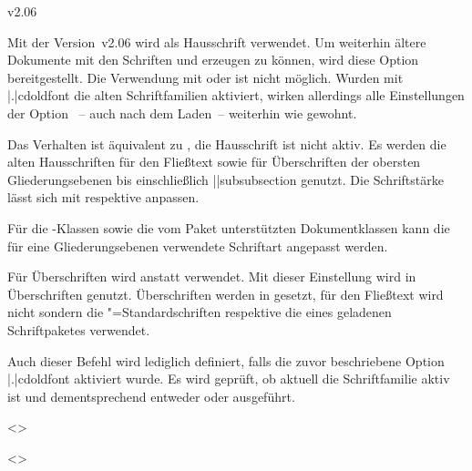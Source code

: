 \begin{NoIndexDefault}
\begin{Cessations}{v2.06}
\begin{Declaration}
Mit der Version~v2.06 wird \OpenSans als Hausschrift verwendet. Um weiterhin 
ältere Dokumente mit den Schriften \Univers und \DIN erzeugen zu können, wird 
diese Option bereitgestellt.
Die Verwendung mit  oder  ist nicht möglich. 
Wurden mit \Option|.|{cdoldfont} die alten Schriftfamilien aktiviert, wirken 
allerdings alle Einstellungen der Option ~-- auch nach dem 
Laden~-- weiterhin wie gewohnt.
\begin{DeclareValues}
  Das Verhalten ist äquivalent zu , die Hausschrift ist 
  nicht aktiv.
  Es werden die alten Hausschriften \Univers für den Fließtext sowie \DIN für 
  Überschriften der obersten Gliederungsebenen bis einschließlich 
  \Macro||{subsubsection} genutzt. Die Schriftstärke lässt sich mit 
   respektive  anpassen.
\end{DeclareValues}

Für die \TUDScript-Klassen sowie die vom Paket  
unterstützten Dokumentklassen kann die für eine Gliederungsebenen verwendete 
Schriftart angepasst werden.
\begin{DeclareValues}
  Für Überschriften wird \Univers anstatt \DIN verwendet.
  Mit dieser Einstellung wird \DIN in Überschriften genutzt. 
  Überschriften werden in \DIN gesetzt, für den Fließtext wird nicht \Univers 
  sondern die "=Standardschriften respektive die eines 
  geladenen Schriftpaketes verwendet.
\end{DeclareValues}
\end{Declaration}

\begin{Cessation}
  {}
\printdeclarationlist

Auch dieser Befehl wird lediglich definiert, falls die zuvor beschriebene 
Option \Option|.|{cdoldfont} aktiviert wurde. Es wird geprüft, ob aktuell die 
Schriftfamilie \DIN aktiv ist und dementsprechend entweder  
oder  ausgeführt. 
\end{Cessation}

\begin{Cessation}
  {}
  <>
\begin{Cessation}
  {}
  <>
\printdeclarationlist


\end{Cessation}
\end{Cessation}
\end{Cessations}
\end{NoIndexDefault}
